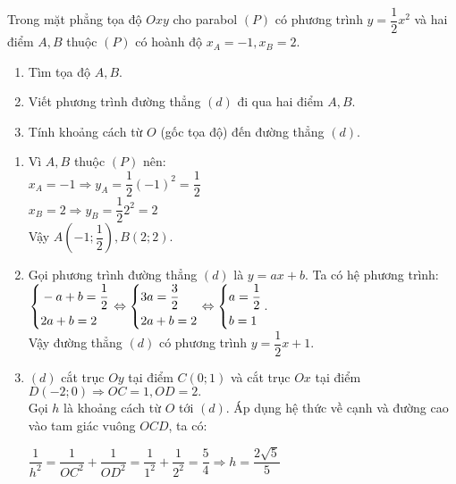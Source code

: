 \begin{ex}%
\hfill

Trong mặt phẳng tọa độ $Oxy$ cho parabol $(P)$ có phương trình $y=\dfrac{1}{2}x^2$ và hai điểm $A, B$ thuộc $(P)$ có hoành độ $x_A=-1, x_B=2$.
\begin{enumerate}
\item Tìm tọa độ $A, B$.
\item Viết phương trình đường thẳng $(d)$ đi qua hai điểm $A, B$.
\item Tính khoảng cách từ $O$ (gốc tọa độ) đến đường thẳng $(d)$.
\end{enumerate}
\loigiai
{
\begin{enumerate}
\item Vì $A, B$ thuộc $(P)$ nên:\\
$x_A=-1 \Rightarrow y_A=\dfrac{1}{2}(-1)^2=\dfrac{1}{2}$\\
$x_B=2 \Rightarrow y_B=\dfrac{1}{2}2^2=2$\\
Vậy $A\left(-1; \dfrac{1}{2}\right), B\left(2; 2\right).$
\item Gọi phương trình đường thẳng $(d)$ là $y = ax + b$. Ta có hệ phương trình:\\
$\left\{\begin{aligned}&-a+b=\dfrac{1}{2}\\&2a+b=2\end{aligned}\right.\Leftrightarrow \left\{\begin{aligned}&3a=\dfrac{3}{2}\\&2a+b=2\end{aligned}\right.\Leftrightarrow \left\{\begin{aligned}&a=\dfrac{1}{2}\\&b=1\end{aligned}\right.$.\\
Vậy đường thẳng $(d)$ có phương trình $y=\dfrac{1}{2}x+1.$
\item $(d)$ cắt trục $Oy$ tại điểm $C(0; 1)$ và cắt trục $Ox$ tại điểm $D(-2; 0) \Rightarrow OC=1, OD=2.$\\
Gọi $h$ là khoảng cách từ $O$ tới $(d)$. Áp dụng hệ thức về cạnh và đường cao vào tam giác vuông $OCD$, ta có:

\centerline{$\dfrac{1}{h^2}=\dfrac{1}{OC^2}+\dfrac{1}{OD^2}=\dfrac{1}{1^2}+\dfrac{1}{2^2}=\dfrac{5}{4} \Rightarrow h=\dfrac{2\sqrt{5}}{5}$}
\end{enumerate}
}
\end{ex}

